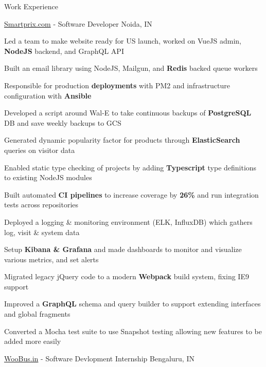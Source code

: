 \documentclass[UKenglish]{resume} %
\begin{document}
\begin{rSection}{Work Experience}

    \begin{rSubsection}
        {\href{https://www.smartprix.com}{Smartprix.com}}
        {  -  }
        {Software Developer}
        {Noida, IN}

        \item Led a team to make website ready for US launch, worked on VueJS admin, \textbf{NodeJS} backend, and GraphQL API
        \item Built an email library using NodeJS, Mailgun, and \textbf{Redis} backed queue workers
        \item Responsible for production \textbf{deployments} with PM2 and infrastructure configuration with \textbf{Ansible}
        \item Developed a script around Wal-E to take continuous backups of \textbf{PostgreSQL} DB and save weekly backups to GCS
        \item Generated dynamic popularity factor for products through \textbf{ElasticSearch} queries on visitor data
        \item Enabled static type checking of projects by adding \textbf{Typescript} type definitions to existing NodeJS modules
        \item Built automated \textbf{CI pipelines} to increase coverage by \textbf{26\%} and run integration tests across repositories
        \item Deployed a logging \& monitoring environment (ELK, InfluxDB) which gathers log, visit \& system data
        \item Setup \textbf{Kibana \& Grafana} and made dashboards to monitor and visualize various metrics, and set alerts
        \item Migrated legacy jQuery code to a modern \textbf{Webpack} build system, fixing IE9 support
        \item Improved a \textbf{GraphQL} schema and query builder to support extending interfaces and global fragments
        \item Converted a Mocha test suite to use Snapshot testing allowing new features to be added more easily

    \end{rSubsection}


    \begin{rSubsection}
        {\href{https://github.com/rohit-smpx?tab=repositories&q=Woobus&type=public}{WooBus.in}}
        {  -  }
        {Software Devlopment Internship}
        {Bengaluru, IN}


\end{rSubsection}
\end{rSection}
\end{document}
